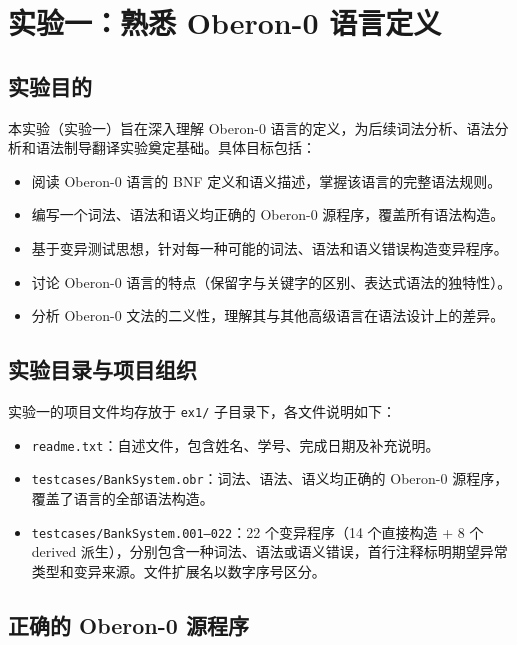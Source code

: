 \chapter{实验一：熟悉 Oberon-0 语言定义}

\section*{实验目的}

本实验（实验一）旨在深入理解 Oberon-0 语言的定义，为后续词法分析、语法分析和语法制导翻译实验奠定基础。具体目标包括：

\begin{itemize}
    \item 阅读 Oberon-0 语言的 BNF 定义和语义描述，掌握该语言的完整语法规则。
    \item 编写一个词法、语法和语义均正确的 Oberon-0 源程序，覆盖所有语法构造。
    \item 基于变异测试思想，针对每一种可能的词法、语法和语义错误构造变异程序。
    \item 讨论 Oberon-0 语言的特点（保留字与关键字的区别、表达式语法的独特性）。
    \item 分析 Oberon-0 文法的二义性，理解其与其他高级语言在语法设计上的差异。
\end{itemize}

\section*{实验目录与项目组织}

实验一的项目文件均存放于 \texttt{ex1/} 子目录下，各文件说明如下：

\begin{itemize}
    \item \texttt{readme.txt}：自述文件，包含姓名、学号、完成日期及补充说明。
    \item \texttt{testcases/BankSystem.obr}：词法、语法、语义均正确的 Oberon-0 源程序，覆盖了语言的全部语法构造。
    \item \texttt{testcases/BankSystem.001--022}：22 个变异程序（14 个直接构造 + 8 个 derived 派生），分别包含一种词法、语法或语义错误，首行注释标明期望异常类型和变异来源。文件扩展名以数字序号区分。
\end{itemize}

\section{正确的 Oberon-0 源程序}

